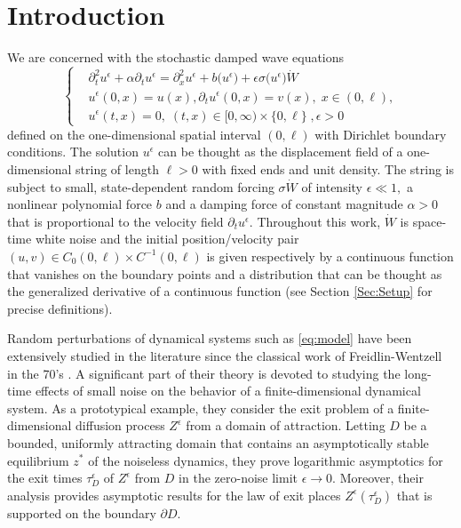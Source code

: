 \documentclass[10pt, reqno]{amsart}
\theoremstyle{definition}
\numberwithin{lem}{section}
\numberwithin{cor}{section}
\numberwithin{prop}{section}
\numberwithin{thm}{section}
\numberwithin{dfn}{section}
\begin{document}
 \section{Introduction}
  We are concerned with the stochastic damped wave equations
	      \begin{equation}\label{eq:model}
	    \left\{\begin{aligned}
	    &\partial^2_t u^\epsilon+\alpha\partial_t u^\epsilon=\partial^2_x u^{\epsilon}  +b\big( u^\epsilon\big)+\epsilon\sigma\big(u^{\epsilon}\big)\dot{W}%
	    \\&u^{\epsilon}(0,x)=u(x), \partial_t u^{\epsilon}(0,x)=v(x),\;  x\in(0,\ell),\\& u^{\epsilon}(t,x)=0,\; (t,x)\in[0,\infty)\times\{0,\ell\}\;,\epsilon>0
	    \end{aligned}\right.
	    \end{equation}
     defined on the one-dimensional spatial interval $(0,\ell)$ with Dirichlet boundary conditions. The solution $u^\epsilon$ can be thought as the displacement field of a one-dimensional  string of length $\ell>0$ with fixed ends and unit density.     The string is subject to small, state-dependent random forcing $\sigma\dot{W}$ of intensity $\epsilon\ll 1,$ a nonlinear polynomial force $b$ and a damping force of constant magnitude $\alpha>0$ that is proportional to the velocity field $\partial_t u^\epsilon.$ Throughout this work, $\dot{W}$ is space-time white noise and the initial position/velocity pair $(u,v)\in C_0(0,\ell)\times C^{-1}(0,\ell)$ is given respectively by a continuous function that vanishes on the boundary points and a distribution that can be thought as the generalized derivative of a continuous function (see Section \ref{Sec:Setup} for precise definitions). 

    Random perturbations of dynamical systems such as \eqref{eq:model} have been extensively studied in the literature since the classical work of Freidlin-Wentzell in the 70's \cite{freidlin1998random}. A significant part of their theory is devoted to studying the long-time effects of small noise on the behavior of a finite-dimensional dynamical system. As a prototypical example, they consider the exit problem of a finite-dimensional diffusion process $Z^\epsilon$ from a domain of attraction. Letting $D$ be a bounded, uniformly attracting domain that contains an asymptotically stable equilibrium $z^*$ of the noiseless dynamics, they prove logarithmic asymptotics for the exit times $\tau^\epsilon_D$ of $Z^\epsilon$ from $D$ in the zero-noise limit $\epsilon\to 0.$ Moreover, their analysis provides asymptotic results for the law of exit places $Z^\epsilon(\tau^\epsilon_D)$ that is supported on the boundary $\partial D.$
\end{document}
